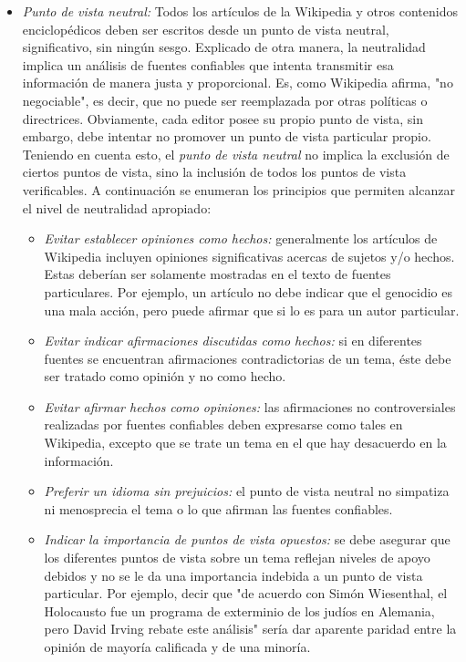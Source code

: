 \begin{itemize}
\item \emph{Punto de vista neutral:} Todos los art\'iculos de la Wikipedia y otros contenidos enciclop\'edicos deben ser escritos desde un punto de vista neutral, significativo, sin ning\'un sesgo. Explicado de otra manera, la neutralidad implica un an\'alisis de fuentes confiables que intenta transmitir esa informaci\'on de manera justa y proporcional. Es, como Wikipedia afirma, "no negociable", es decir, que no puede ser reemplazada por otras pol\'iticas o directrices.
Obviamente, cada editor posee su propio punto de vista, sin embargo, debe intentar no promover un punto de vista particular propio. Teniendo en cuenta esto, el \emph{punto de vista neutral} no implica la exclusi\'on de ciertos puntos de vista, sino la inclusi\'on de todos los puntos de vista verificables.
A continuaci\'on se enumeran los principios que permiten alcanzar el nivel de neutralidad apropiado:
\begin{itemize}
\item \emph{Evitar establecer opiniones como hechos:} generalmente los art\'iculos de Wikipedia incluyen opiniones significativas acercas de sujetos y/o hechos. Estas deber\'ian ser solamente mostradas en el texto de fuentes particulares. Por ejemplo, un art\'iculo no debe indicar que el genocidio es una mala acci\'on, pero puede afirmar que si lo es para un autor particular.
\item \emph{Evitar indicar afirmaciones discutidas como hechos:} si en diferentes fuentes se encuentran afirmaciones contradictorias de un tema, \'este debe ser tratado como opini\'on y no como hecho.
\item \emph{Evitar afirmar hechos como opiniones:} las afirmaciones no controversiales realizadas por fuentes confiables deben expresarse como tales en Wikipedia, excepto que se trate un tema en el que hay desacuerdo en la informaci\'on.
\item \emph{Preferir un idioma sin prejuicios:}  el punto de vista neutral no simpatiza ni menosprecia el tema o lo que afirman las fuentes confiables.
\item \emph{Indicar la importancia de puntos de vista opuestos:} se debe asegurar que los diferentes puntos de vista sobre un tema reflejan niveles de apoyo debidos y no se le da una importancia indebida a un punto de vista particular. Por ejemplo, decir que "de acuerdo con Sim\'on Wiesenthal, el Holocausto fue un programa de exterminio de los jud\'ios en Alemania, pero David Irving rebate este an\'alisis"  ser\'ia dar aparente paridad entre la opini\'on de mayor\'ia calificada y de una minor\'ia.
\end{itemize}


\end{itemize}
